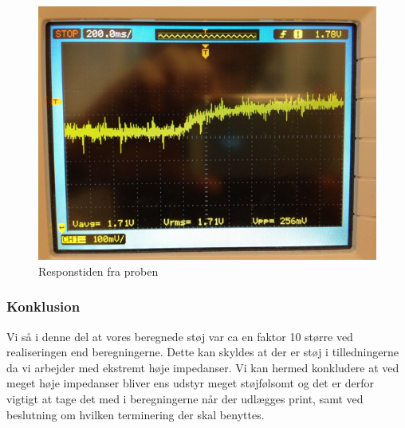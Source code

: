  \begin{figure}[H]
	\centering 
	\includegraphics[scale=0.8]{HardwareArkitektur/Sensore/pH_probe_billeder/respons.png}
	\caption{Responstiden fra proben}
	\label{photo:respons}
\end{figure} 

\subsubsection{Konklusion}
Vi så i denne del at vores beregnede støj var ca en faktor 10 større ved realiseringen end beregningerne. Dette kan skyldes at der er støj i tilledningerne da vi arbejder med ekstremt høje impedanser. Vi kan hermed konkludere at ved meget høje impedanser bliver ens udstyr meget støjfølsomt og det er derfor vigtigt at tage det med i beregningerne når der udlægges print, samt ved beslutning om hvilken terminering der skal benyttes. 



